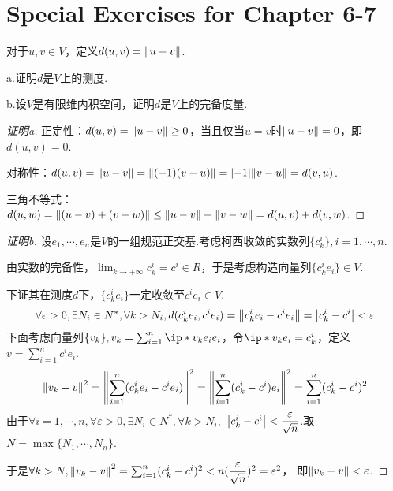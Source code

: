 \section{Special Exercises for Chapter 6-7}

\begin{problem}[6.A.29]\label{6.A.29}
    对于\(u,v \in V\)，定义\(d(u,v)=\norm*{u-v}\).

    a.证明\(d\)是\(V\)上的测度.
    
    b.设\(V\)是有限维内积空间，证明\(d\)是\(V\)上的完备度量.
\end{problem}

\begin{proof}[证明a]
    正定性：\(d(u,v)=\norm*{u-v} \geq 0\)，当且仅当\(u=v\)时\(\norm*{u-v}=0\)，即\(d(u,v)=0\).

    对称性：\(d(u,v)=\norm*{u-v}=\norm*{(-1)(v-u)}=\abs*{-1}\norm*{v-u}=d(v,u)\).
    
    三角不等式：\(d(u,w)=\norm*{(u-v)+(v-w)} \leq \norm*{u-v}+\norm*{v-w}=d(u,v)+d(v,w)\).
\end{proof}

\begin{proof}[证明b]
    设\(e_1,\cdots,e_n\)是\(V\)的一组规范正交基.考虑柯西收敛的实数列\(\{c_k^i\},i=1,\cdots,n\).

    由实数的完备性，\(\lim_{k \rightarrow +\infty}c_k^i=c^i \in R\)，于是考虑构造向量列\(\{c_k^ie_i\} \in V\).
    
    下证其在测度\(d\)下，\(\{c_k^ie_i\}\)一定收敛至\(c^ie_i \in V\).
    \begin{align*}
        \forall \varepsilon>0,\exists N_i \in N^*,\forall k>N_i,
        d(c_k^ie_i,c^ie_i)=\norm*{c_k^ie_i-c^ie_i}=\abs*{c_k^i-c^i}<\varepsilon
    \end{align*}
    下面考虑向量列\(\{v_k\},v_k=\sum_{i=1}^n \ip*{v_k}{e_i}e_i\)，令\(\ip*{v_k}{e_i}=c_k^i\)，定义\(v=\sum_{i=1}^n c^ie_i\).
    \begin{align*}
        \norm*{v_k-v}^2=\norm*{\sum_{i=1}^n(c_k^ie_i-c^ie_i)}^2=\norm*{\sum_{i=1}^n(c_k^i-c^i)e_i}^2
        =\sum_{i=1}^n(c_k^i-c^i)^2
    \end{align*}
    由于\(\forall i=1,\cdots,n,\forall \varepsilon>0,\exists N_i \in N^*,\forall k>N_i,\)
    \(\abs*{c_k^i-c^i}<\dfrac{\varepsilon}{\sqrt{n}}\).取\(N=\max\{N_1,\cdots,N_n\}\).
    
    于是\(\forall k>N,\norm*{v_k-v}^2=\sum_{i=1}^n(c_k^i-c^i)^2<n(\dfrac{\varepsilon}{\sqrt{n}})^2=\varepsilon^2\)，
    即\(\norm*{v_k-v}<\varepsilon\).
\end{proof}

